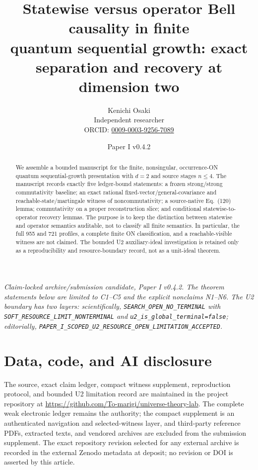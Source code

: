 \documentclass[11pt]{article}
\title{\textbf{Statewise versus operator Bell causality in finite\\
quantum sequential growth: exact separation and recovery at dimension two}}
\author{Kenichi Osaki\\
\small Independent researcher\\
\small ORCID: \href{https://orcid.org/0009-0003-9256-7089}{0009-0003-9256-7089}}
\date{Paper I v0.4.2}
\theoremstyle{definition}
\theoremstyle{remark}
\begin{document}
\maketitle

\begin{center}
\small\emph{Claim-locked archive/submission candidate, Paper I v0.4.2.  The
theorem statements below are limited to C1--C5 and the explicit nonclaims
N1--N6.  The U2 boundary has two layers: scientifically,
\texttt{SEARCH\_OPEN\_NO\_TERMINAL} with
\texttt{SOFT\_RESOURCE\_LIMIT\_NONTERMINAL} and
\texttt{u2\_is\_global\_terminal=false}; editorially,
\texttt{PAPER\_I\_SCOPED\_U2\_RESOURCE\_OPEN\_LIMITATION\_ACCEPTED}.}
\end{center}

\begin{abstract}
We assemble a bounded manuscript for the finite, nonsingular, occurrence-ON
quantum sequential-growth presentation with \(d=2\) and source stages
\(n\leq4\).  The manuscript records exactly five ledger-bound statements:
a frozen strong/strong commutativity baseline; an exact rational
fixed-vector/general-covariance and reachable-state/martingale witness of
noncommutativity; a source-native Eq.~(120) lemma; commutativity on a proper
reconstruction slice; and conditional statewise-to-operator recovery lemmas.
The purpose is to keep the distinction between statewise and operator
semantics auditable, not to classify all finite semantics.  In particular,
the full 955 and 721 profiles, a complete finite ON classification, and a
reachable-visible witness are not claimed.  The bounded U2 auxiliary-ideal
investigation is retained only as a reproducibility and resource-boundary
record, not as a unit-ideal theorem.
\end{abstract}

\section{Data, code, and AI disclosure}

The source, exact claim ledger, compact witness supplement, reproduction
protocol, and bounded U2 limitation record are maintained in the project
repository at
\url{https://github.com/To-marigi/universe-theory-lab}.  The complete weak
electronic ledger remains the authority; the compact supplement is an
authenticated navigation and selected-witness layer, and third-party
reference PDFs, extracted texts, and vendored archives are excluded from the
submission supplement.  The exact repository revision selected for any
external archive is recorded in the external Zenodo metadata at deposit; no
revision or DOI is asserted by this article.
\end{document}
